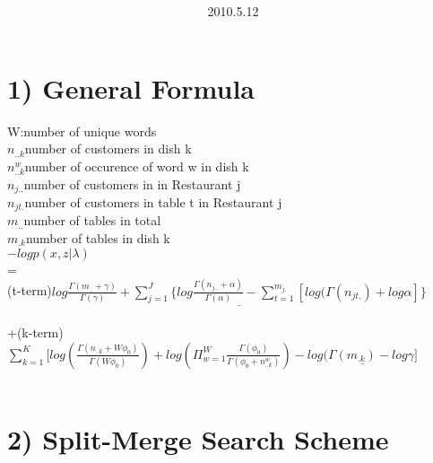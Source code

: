 \documentclass{article}
\title{\vspace{0.3in}\textmd{\textbf{\hmwkTitle}}}
\date{2010.5.12}
\author{\textbf{\hmwkAuthorName}}
\begin{document}
\begin{spacing}{1.1}
\maketitle
\section{1) General Formula}
W:number of unique words\\ 
$n_{..k}$number of customers in dish k \\
$n_{..k}^{w}$number of occurence of word w in dish k \\
$n_{j..}$number of customers in in Restaurant j \\
$n_{jt.}$number of customers in table t in Restaurant j \\
$m_{..}$number of tables in total \\
$m_{.k}$number of tables in dish k \\
$-log p(x,z|\lambda)$\\ =\\
(t-term)$ \underline{log \frac{\Gamma(m_{..}+\gamma)}{\Gamma(\gamma)}+\sum_{j=1}^{J} \{log \frac{\Gamma(n_{j..}+\alpha)}{\Gamma(\alpha)}-\sum_{t=1}^{m_{j.}}[log(\Gamma(n_{jt.})+log \alpha
]\}}$\\ \\
+(k-term)$ \sum_{k=1}^{K} [log(\frac{\Gamma(n_{..k}+W\phi_{0})}{\Gamma(W\phi_{0})})+log(\Pi_{w=1}^{W}\frac{\Gamma(\phi_{0})}{\Gamma(\phi_{0}+n_{..k}^{w})})
-\underline{log(\Gamma(m_{.k})-log \gamma]}$\\ \\ 
\section{2) Split-Merge Search Scheme}

\end{spacing}
\end{document}
